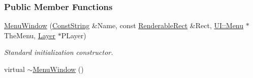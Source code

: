 \subsubsection*{Public Member Functions}
\begin{DoxyCompactItemize}
\item 
\hyperlink{classphys_1_1UI_1_1MenuWindow_a966a303c617819dc5360f2e76ea59194}{MenuWindow} (\hyperlink{namespacephys_a5ce5049f8b4bf88d6413c47b504ebb31}{ConstString} \&Name, const \hyperlink{structphys_1_1UI_1_1RenderableRect}{RenderableRect} \&Rect, \hyperlink{classphys_1_1UI_1_1Menu}{UI::Menu} $\ast$TheMenu, \hyperlink{classphys_1_1UI_1_1Layer}{Layer} $\ast$PLayer)
\begin{DoxyCompactList}\small\item\em Standard initialization constructor. \item\end{DoxyCompactList}\item 
\hypertarget{classphys_1_1UI_1_1MenuWindow_a8de1eab7a7897e24dfb722cce7d903eb}{
virtual \hyperlink{classphys_1_1UI_1_1MenuWindow_a8de1eab7a7897e24dfb722cce7d903eb}{$\sim$MenuWindow} ()}
\label{classphys_1_1UI_1_1MenuWindow_a8de1eab7a7897e24dfb722cce7d903eb}


\end{DoxyCompactItemize}
